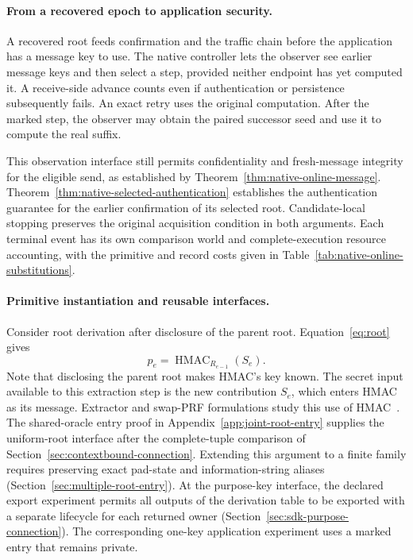 \documentclass[pdflatex]{sn-jnl}
\theoremstyle{thmstyleone}
\theoremstyle{thmstylethree}
\theoremstyle{thmstyletwo}
\begin{document}
\paragraph{From a recovered epoch to application security.}
A recovered root feeds confirmation and the traffic chain before the
application has a message key to use. The native controller lets the
observer see earlier message keys and then select a step, provided
neither endpoint has yet computed it. A receive-side advance counts
even if authentication or persistence subsequently fails. An exact
retry uses the original computation. After the marked step, the
observer may obtain the paired successor seed and use it to compute
the real suffix.

This observation interface still permits confidentiality and
fresh-message integrity for the eligible send, as established by
Theorem~\ref{thm:native-online-message}.
Theorem~\ref{thm:native-selected-authentication} establishes the
authentication guarantee for the earlier confirmation of its selected
root. Candidate-local stopping preserves the original acquisition
condition in both arguments. Each terminal event has its own comparison
world and complete-execution resource accounting, with the primitive
and record costs given in Table~\ref{tab:native-online-substitutions}.

\paragraph{Primitive instantiation and reusable interfaces.}
Consider root derivation after disclosure of the parent root.
Equation~\eqref{eq:root} gives
\[
 p_e=\operatorname{HMAC}_{R_{e-1}}(S_e).
\]
Note that disclosing the parent root makes HMAC's key known. The secret
input available to this extraction step is the new contribution $S_e$,
which enters HMAC as its message. Extractor and swap-PRF formulations
study this use of HMAC~\cite{hmacswap2023,rfc5869}.
The shared-oracle entry proof in Appendix~\ref{app:joint-root-entry}
supplies the uniform-root interface after the complete-tuple comparison
of Section~\ref{sec:contextbound-connection}. Extending this argument
to a finite family requires preserving exact pad-state and
information-string aliases (Section~\ref{sec:multiple-root-entry}).
At the purpose-key interface, the declared export experiment permits
all outputs of the derivation table to be exported with a separate
lifecycle for each returned owner
(Section~\ref{sec:sdk-purpose-connection}). The corresponding one-key
application experiment uses a marked entry that remains private.
\end{document}
